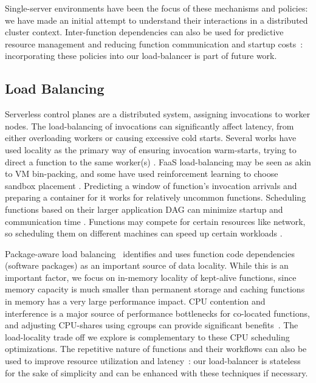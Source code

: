 Single-server environments have been the focus of these mechanisms and policies: we have made an initial attempt to understand their interactions in a distributed cluster context.
Inter-function dependencies can also be used for predictive resource management and reducing function communication and startup costs~\cite{gunasekaran2020fifer, daw2021speedo, shen2021defuse}: incorporating these policies into our load-balancer is part of future work. 

\subsection{Load Balancing}

Serverless control planes are a distributed system, assigning invocations to worker nodes.
The load-balancing of invocations can significantly affect latency, from either overloading workers or causing excessive cold starts. 
Several works have used locality as the primary way of ensuring invocation warm-starts, trying to direct a function to the same worker(s) \cite{package-cristina-19, leegreedy}.
FaaS load-balancing may be seen as akin to VM bin-packing, and some have used reinforcement learning to choose sandbox placement \cite{balaji2021fireplace}.
Predicting a window of function's invocation arrivals and preparing a container for it \cite{shahrad2020serverless} works for relatively uncommon functions.
Scheduling functions based on their larger application DAG can minimize startup and communication time \cite{shen2021defuse, abdi2023palette, guo_decomposing_2022, kotni2021faastlane, shen_defuse_2021,mahgoub_wisefuse_2022,zhou_qos-aware_2022}.
Functions may compete for certain resources like network, so scheduling them on different machines can speed up certain workloads \cite{tian_owl_2022}.

Package-aware load balancing~\cite{package-cristina-19}  identifies and uses function code dependencies (software packages) as an important source of data locality.
While this is an important factor, we focus on in-memory locality of kept-alive functions, since memory capacity is much smaller than permanent storage and caching functions in memory has a very large performance impact.
%
CPU contention and interference is a major source of performance bottlenecks for co-located functions, and adjusting CPU-shares using cgroups can provide significant benefits~\cite{suresh2019fnsched, suresh2021servermore, ensure-faas-acsos20}.
%
The load-locality trade off we explore is complementary to these CPU scheduling optimizations. 
%
The repetitive nature of functions and their workflows can also be used to improve resource utilization and latency~\cite{hunhoff2020proactive, yu2021faasrank, puru_xanadu_20, przybylski2021data}: our load-balancer is stateless for the sake of simplicity and can be enhanced with these techniques if necessary.


